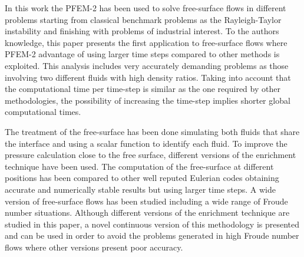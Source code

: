 
In this work the PFEM-2 has been used to solve free-surface flows in different problems starting from classical benchmark problems as the Rayleigh-Taylor instability and finishing with problems of industrial interest. To the authors knowledge, this paper presents the first application to free-surface flows where PFEM-2 advantage of using larger time steps compared to other methods is exploited. This analysis includes very accurately demanding problems as those involving two different fluids with high density ratios. Taking into account that the computational time per time-step is similar as the one required by other methodologies, the possibility of increasing the time-step implies shorter global computational times.

The treatment of the free-surface has been done simulating both fluids that share the interface and using a scalar function to identify each fluid. To improve the pressure calculation close to the free surface, different versions of the enrichment technique \cite{Coppola05} have been used. The computation of the free-surface at different positions has been compared to other well reputed Eulerian codes obtaining accurate and numerically stable results but using larger time steps. A wide version of free-surface flows has been studied including a wide range of Froude number situations. Although different versions of the enrichment technique are studied in this paper, a novel continuous version of this methodology is presented and can be used in order to avoid the problems generated in high Froude number flows where other versions present poor accuracy. 